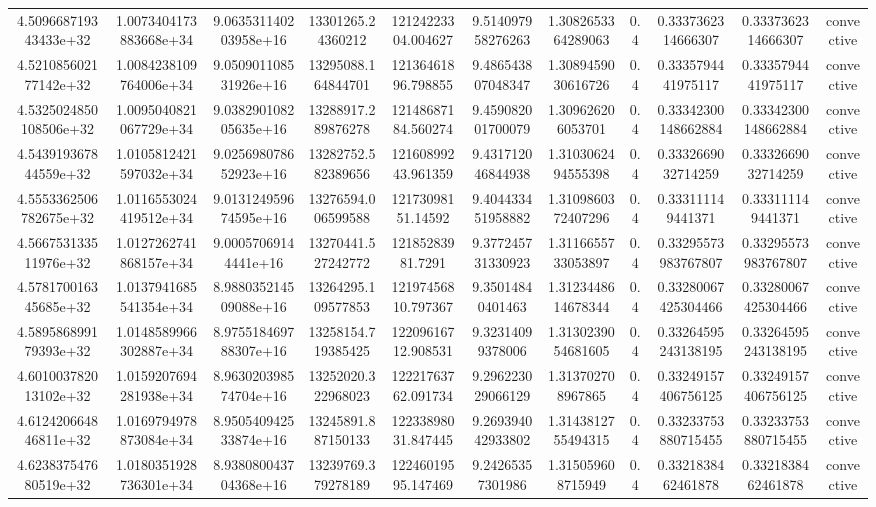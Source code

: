 \begin{table}
\begin{tabular}{ccccccccccc}
4.509668719343433e+32 & 1.0073404173883668e+34 & 9.063531140203958e+16 & 13301265.24360212 & 12124223304.004627 & 9.514097958276263 & 1.3082653364289063 & 0.4 & 0.3337362314666307 & 0.3337362314666307 & convective \\
4.521085602177142e+32 & 1.0084238109764006e+34 & 9.050901108531926e+16 & 13295088.164844701 & 12136461896.798855 & 9.486543807048347 & 1.3089459030616726 & 0.4 & 0.3335794441975117 & 0.3335794441975117 & convective \\
4.5325024850108506e+32 & 1.0095040821067729e+34 & 9.038290108205635e+16 & 13288917.289876278 & 12148687184.560274 & 9.459082001700079 & 1.309626206053701 & 0.4 & 0.33342300148662884 & 0.33342300148662884 & convective \\
4.543919367844559e+32 & 1.0105812421597032e+34 & 9.025698078652923e+16 & 13282752.582389656 & 12160899243.961359 & 9.431712046844938 & 1.3103062494555398 & 0.4 & 0.3332669032714259 & 0.3332669032714259 & convective \\
4.5553362506782675e+32 & 1.0116553024419512e+34 & 9.013124959674595e+16 & 13276594.006599588 & 12173098151.14592 & 9.404433451958882 & 1.3109860372407296 & 0.4 & 0.333111149441371 & 0.333111149441371 & convective \\
4.566753133511976e+32 & 1.0127262741868157e+34 & 9.00057069144441e+16 & 13270441.527242772 & 12185283981.7291 & 9.377245731330923 & 1.3116655733053897 & 0.4 & 0.33295573983767807 & 0.33295573983767807 & convective \\
4.578170016345685e+32 & 1.0137941685541354e+34 & 8.988035214509088e+16 & 13264295.109577853 & 12197456810.797367 & 9.35014840401463 & 1.3123448614678344 & 0.4 & 0.33280067425304466 & 0.33280067425304466 & convective \\
4.589586899179393e+32 & 1.0148589966302887e+34 & 8.975518469788307e+16 & 13258154.719385425 & 12209616712.908531 & 9.32314099378006 & 1.3130239054681605 & 0.4 & 0.33264595243138195 & 0.33264595243138195 & convective \\
4.601003782013102e+32 & 1.0159207694281938e+34 & 8.963020398574704e+16 & 13252020.322968023 & 12221763762.091734 & 9.296223029066129 & 1.313702708967865 & 0.4 & 0.33249157406756125 & 0.33249157406756125 & convective \\
4.612420664846811e+32 & 1.0169794978873084e+34 & 8.950540942533874e+16 & 13245891.887150133 & 12233898031.847445 & 9.269394042933802 & 1.3143812755494315 & 0.4 & 0.33233753880715455 & 0.33233753880715455 & convective \\
4.623837547680519e+32 & 1.0180351928736301e+34 & 8.938080043704368e+16 & 13239769.379278189 & 12246019595.147469 & 9.24265357301986 & 1.315059608715949 & 0.4 & 0.3321838462461878 & 0.3321838462461878 & convective \\

\end{tabular}
\end{table}
